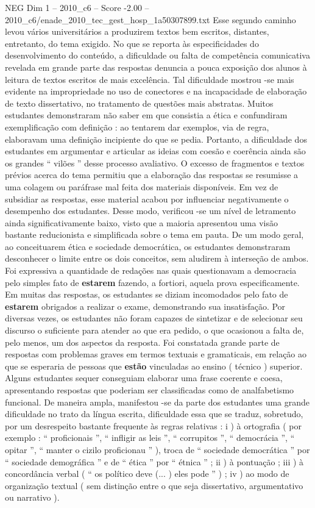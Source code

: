 \begin{textsample}{NEG Dim 1 – 2010\_c6 – Score -2.00 – 2010\_c6/enade\_2010\_tec\_gest\_hosp\_1a50307899.txt}
Esse segundo caminho levou vários universitários a produzirem textos bem escritos, distantes, entretanto, do tema exigido.
No que se reporta às especificidades do desenvolvimento do conteúdo, a dificuldade ou falta de competência comunicativa revelada em grande parte das respostas denuncia a pouca exposição dos alunos à leitura de textos escritos de mais excelência.
Tal dificuldade mostrou -se mais evidente na impropriedade no uso de conectores e na incapacidade de elaboração de texto dissertativo, no tratamento de questões mais abstratas.
Muitos estudantes demonstraram não saber em que consistia a ética e confundiram exemplificação com definição : ao tentarem dar exemplos, via de regra, elaboravam uma definição incipiente do que se pedia.
Portanto, a dificuldade dos estudantes em argumentar e articular as ideias com coesão e coerência ainda são os grandes “ vilões ” desse processo avaliativo.
O excesso de fragmentos e textos prévios acerca do tema permitiu que a elaboração das respostas se resumisse a uma colagem ou paráfrase mal feita dos materiais disponíveis.
Em vez de subsidiar as respostas, esse material acabou por influenciar negativamente o desempenho dos estudantes.
Desse modo, verificou -se um nível de letramento ainda significativamente baixo, visto que a maioria apresentou uma visão bastante reducionista e simplificada sobre o tema em pauta.
De um modo geral, ao conceituarem ética e sociedade democrática, os estudantes demonstraram desconhecer o limite entre os dois conceitos, sem aludirem à interseção de ambos.
Foi expressiva a quantidade de redações nas quais questionavam a democracia pelo simples fato de \textbf{estarem} fazendo, a fortiori, aquela prova especificamente.
Em muitas das respostas, os estudantes se diziam incomodados pelo fato de \textbf{estarem} obrigados a realizar o exame, demonstrando sua insatisfação.
Por diversas vezes, os estudantes não foram capazes de sintetizar e de selecionar seu discurso o suficiente para atender ao que era pedido, o que ocasionou a falta de, pelo menos, um dos aspectos da resposta.
Foi constatada grande parte de respostas com problemas graves em termos textuais e gramaticais, em relação ao que se esperaria de pessoas que \textbf{estão} vinculadas ao ensino ( técnico ) superior.
Alguns estudantes sequer conseguiam elaborar uma frase coerente e coesa, apresentando respostas que poderiam ser classificadas como de analfabetismo funcional.
De maneira ampla, manifestou -se da parte dos estudantes uma grande dificuldade no trato da língua escrita, dificuldade essa que se traduz, sobretudo, por um desrespeito bastante frequente às regras relativas : i ) à ortografia ( por exemplo : “ proficionais ”, “ infligir as leis ”, “ corrupitos ”, “ democrácia ”, “ opitar ”, “ manter o cizilo proficionau ” ), troca de “ sociedade democrática ” por “ sociedade demográfica ” e de “ ética ” por “ étnica ” ; ii ) à pontuação ; iii ) à concordância verbal ( “ os político deve (... ) eles pode ” ) ; iv ) ao modo de organização textual ( sem distinção entre o que seja dissertativo, argumentativo ou narrativo ).

\end{textsample}
